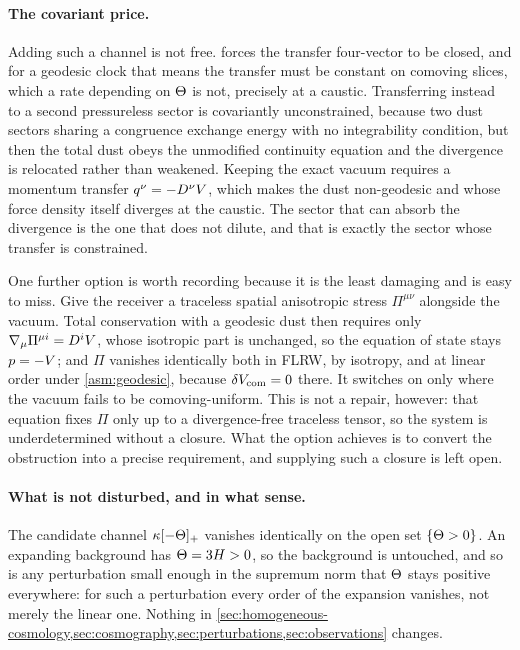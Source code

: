 \paragraph{The covariant price.} Adding such a channel is not free.
 forces the transfer four-vector to be closed,
and for a geodesic clock that means the transfer must be constant on comoving
slices, which a rate depending on $\Theta$ is not, precisely at a caustic.
Transferring instead to a second pressureless sector is covariantly
unconstrained, because two dust sectors sharing a congruence exchange energy
with no integrability condition, but then the total dust obeys the unmodified
continuity equation and the divergence is relocated rather than weakened.
Keeping the exact vacuum requires a momentum transfer $q^\nu=-D^\nu V$,
which makes the dust non-geodesic and whose force density itself diverges at
the caustic. The sector that can absorb the divergence is the one that does not
dilute, and that is exactly the sector whose transfer is constrained.

One further option is worth recording because it is the least damaging and is
easy to miss. Give the receiver a traceless spatial anisotropic stress
$\Pi^{\mu\nu}$ alongside the vacuum. Total conservation with a geodesic dust
then requires only $\nabla_\mu\Pi^{\mu i}=D^i V$, whose isotropic part is
unchanged, so the equation of state stays $p=-V$; and $\Pi$ vanishes
identically both in FLRW, by isotropy, and at linear order under
\cref{asm:geodesic}, because $\delta V_{\rm com}=0$ there. It switches on
only where the vacuum fails to be comoving-uniform. This is not a repair,
however: that equation fixes $\Pi$ only up to a divergence-free traceless
tensor, so the system is underdetermined without a closure. What the option
achieves is to convert the obstruction into a precise requirement, and
supplying such a closure is left open.

\paragraph{What is not disturbed, and in what sense.} The candidate channel
$\kappa[-\Theta]_+$ vanishes identically on the open set $\{\Theta>0\}$. An
expanding background has $\Theta=3H>0$, so the background is untouched, and
so is any perturbation small enough in the supremum norm that $\Theta$ stays
positive everywhere: for such a perturbation every order of the expansion
vanishes, not merely the linear one. Nothing in
\cref{sec:homogeneous-cosmology,sec:cosmography,sec:perturbations,sec:observations}
changes.

